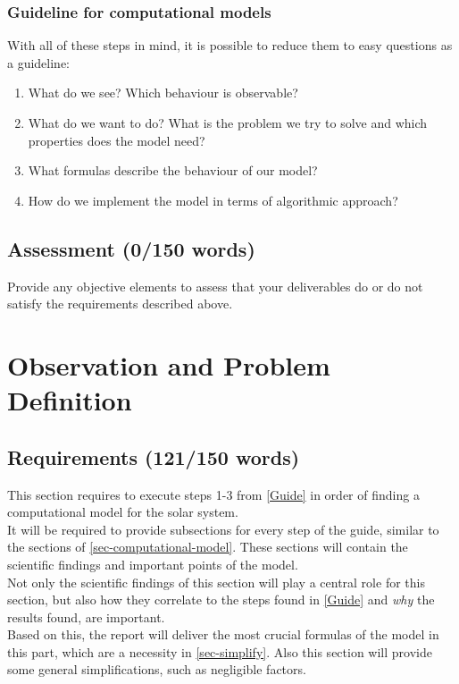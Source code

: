 \documentclass[conference,compsoc]{IEEEtran}
\begin{document}
\subsubsection{Guideline for computational models}
With all of these steps in mind, it is possible to reduce them to easy questions as a guideline:
\label{Guide}
\begin{enumerate}
	\item What do we see? Which behaviour is observable?
	\item What do we want to do? What is the problem we try to solve and which properties does the model need?
	\item What formulas describe the behaviour of our model?
	\item How do we implement the model in terms of algorithmic approach?
\end{enumerate}
\subsection{Assessment (0/150 words)}
Provide any objective elements to assess that your deliverables do or do not satisfy the requirements described above. 


\section{Observation and Problem Definition}
\label{sec-modeling}
\subsection{Requirements (121/150 words)}
This section requires to execute steps 1-3 from \ref{Guide} in order of finding a computational model for the solar system. \\
It will be required to provide subsections for every step of the guide, similar to the sections of \ref{sec-computational-model}. These sections will contain the scientific findings and important points of the model. \\
Not only the scientific findings of this section will play a central role for this section, but also how they correlate to the steps found in \ref{Guide} and \emph{why} the results found, are important. \\
Based on this, the report will deliver the most crucial formulas of the model in this part, which are a necessity in \ref{sec-simplify}. Also this section will provide some general simplifications, such as negligible factors.
\end{document}
